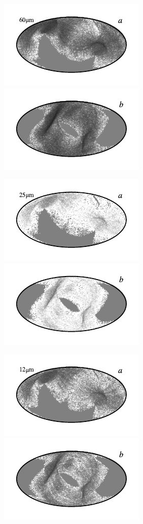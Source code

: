 \documentclass{aa}
\begin{document}
\begin{figure}
	\includegraphics{figs/rms_maps/rms_07a_c0001_000022.pdf}\includegraphics{figs/rms_maps/rms_07b_c0001_000022.pdf}
  \vspace*{-0.85cm}

	\includegraphics{figs/rms_maps/rms_06a_c0001_000022.pdf}\includegraphics{figs/rms_maps/rms_06b_c0001_000022.pdf}
  \vspace*{-0.85cm}

	\includegraphics{figs/rms_maps/rms_05a_c0001_000022.pdf}\includegraphics{figs/rms_maps/rms_05b_c0001_000022.pdf}
  \vspace*{-0.85cm}


\end{figure}
\end{document}
